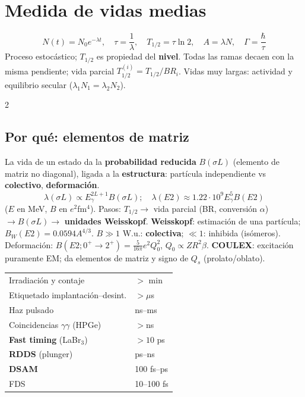 \documentclass[10pt,a4paper]{article}
\begin{document}
\section{Medida de vidas medias}
\begin{clave}
\[ N(t)=N_0e^{-\lambda t},\quad \tau=\frac1\lambda,\quad T_{1/2}=\tau\ln2,\quad A=\lambda N,\quad \Gamma=\frac{\hbar}{\tau} \]
Proceso estocástico; $T_{1/2}$ es propiedad del \textbf{nivel}. Todas las ramas decaen con la misma pendiente; vida parcial $T_{1/2}^{(i)}=T_{1/2}/BR_i$.
Vidas muy largas: actividad y equilibrio secular ($\lambda_1N_1=\lambda_2N_2$).
\end{clave}
\begin{multicols}{2}
\subsection{Por qué: elementos de matriz}
La vida de un estado da la \textbf{probabilidad reducida} $B(\sigma L)$ (elemento de matriz no diagonal), ligada a la \textbf{estructura}: partícula independiente vs \textbf{colectivo}, \textbf{deformación}.
\[ \lambda(\sigma L)\propto E_\gamma^{2L+1}B(\sigma L);\quad \lambda(E2)\approx1.22\cdot10^9E_\gamma^5B(E2) \]
($E$ en MeV, $B$ en $e^2$fm$^4$). Pasos: $T_{1/2}\to$ vida parcial (BR, conversión $\alpha$) $\to B(\sigma L)\to$ \textbf{unidades Weisskopf}.
\textbf{Weisskopf}: estimación de una partícula; $B_W(E2)=0.0594A^{4/3}$. $B\gg1$ W.u.: \textbf{colectiva}; $\ll1$: inhibida (isómeros).
Deformación: $B(E2;0^+\to2^+)=\frac{5}{16\pi}e^2Q_0^2$, $Q_0\propto ZR^2\beta$.
\textbf{COULEX}: excitación puramente EM; da elementos de matriz y signo de $Q_s$ (prolato/oblato).
\begin{clave}
\begin{tabular}{@{}ll@{}}
Irradiación y contaje & $>$ min\\
Etiquetado implantación--desint. & $>\mu$s\\
Haz pulsado & ns--ms\\
Coincidencias $\gamma\gamma$ (HPGe) & $>$ns\\
\textbf{Fast timing} (LaBr$_3$) & $>10$ ps\\
\textbf{RDDS} (plunger) & ps--ns\\
\textbf{DSAM} & 100 fs--ps\\
FDS & 10--100 fs\\
\end{tabular}
\end{clave}
\columnbreak
\begin{clave}

\end{clave}
\end{multicols}
\end{document}
